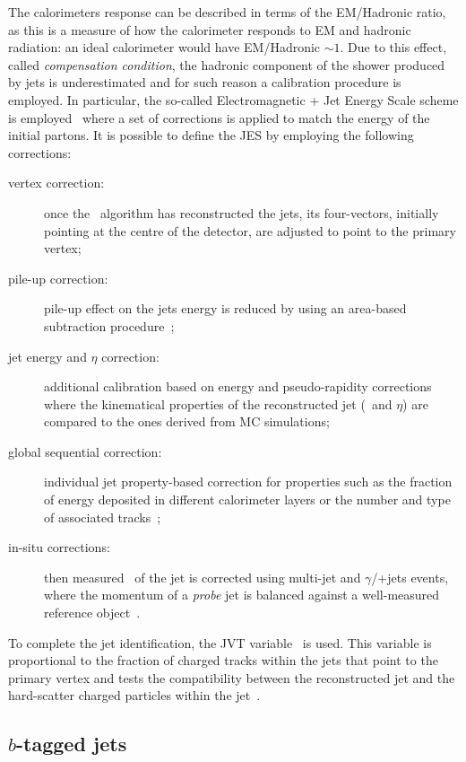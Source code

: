 			The calorimeters response can be described in terms of the \ac{EM}/Hadronic ratio, as this is a measure of how the calorimeter responds to \ac{EM} and hadronic radiation: an ideal calorimeter would have \ac{EM}/Hadronic $\sim1$. Due to this effect, called \emph{compensation condition}, the hadronic component of the shower produced by jets is underestimated and for such reason a calibration procedure is employed. In particular, the so-called Electromagnetic + Jet Energy Scale scheme is employed~\cite{ATL-PHYS-PUB-2015-015} where a set of corrections is applied to match the energy of the initial partons. It is possible to define the \ac{JES} by employing the following corrections:

			\begin{description}
				\item[vertex correction:] once the \antikt\ algorithm has reconstructed the jets, its four-vectors, initially pointing at the centre of the detector, are adjusted to point to the primary vertex; 
				\item[pile-up correction:] pile-up effect on the jets energy is reduced by using an area-based subtraction procedure~\cite{TheATLAScollaboration:2013pia}; 
				\item[jet energy and $\eta$ correction:] additional calibration based on energy and pseudo-rapidity corrections where the kinematical properties of the reconstructed jet (\pt\ and $\eta$) are compared to the ones derived from \ac{MC} simulations; 
				\item[global sequential correction:] individual jet property-based correction for properties such as the fraction of energy deposited in different calorimeter layers or the number and type of associated tracks~\cite{ATLAS:2015oia}; 
				\item[in-situ corrections:] then measured \pt\ of the jet is corrected using multi-jet and $\gamma$/\Zboson+jets events, where the momentum of a \emph{probe} jet is balanced against a well-measured reference object~\cite{ATLAS-CONF-2015-017}.
			\end{description}

			To complete the jet identification, the \ac{JVT} variable~\cite{ATLAS-CONF-2014-018} is used. This variable is proportional to the fraction of charged tracks within the jets that point to the primary vertex and tests the compatibility between the reconstructed jet and the hard-scatter charged particles within the jet~\cite{Aaboud:2017pou}.


		\subsection*{$b$-tagged jets}


